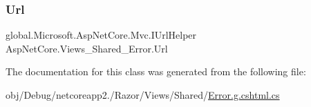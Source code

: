 \subsubsection{\texorpdfstring{Url}{Url}}
{\footnotesize\ttfamily global.\+Microsoft.\+Asp\+Net\+Core.\+Mvc.\+I\+Url\+Helper Asp\+Net\+Core.\+Views\+\_\+\+Shared\+\_\+\+Error.\+Url\hspace{0.3cm}{\ttfamily [get]}}



The documentation for this class was generated from the following file\+:\begin{DoxyCompactItemize}
\item 
obj/\+Debug/netcoreapp2./\+Razor/\+Views/\+Shared/\mbox{\hyperlink{_error_8g_8cshtml_8cs}{Error.\+g.\+cshtml.\+cs}}\end{DoxyCompactItemize}

